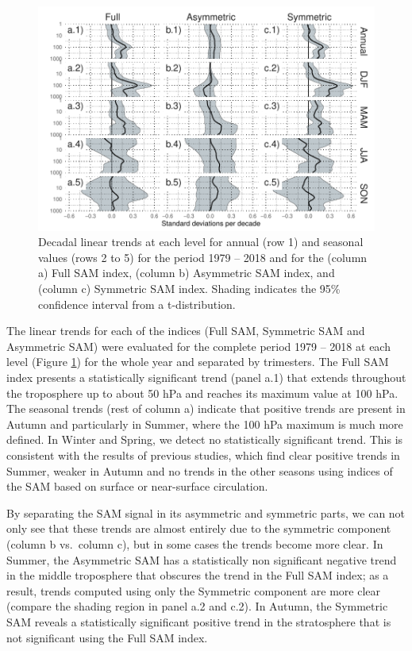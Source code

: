 \documentclass[]{ametsocV5}
\begin{document}
\begin{figure}
\includegraphics{trends-1} \caption[Decadal linear trends at each level for annual (row 1) and seasonal values (rows 2 to 5) for the period 1979 -- 2018 and for the (column a) Full SAM index, (column b) Asymmetric SAM index, and (column c) Symmetric SAM index]{Decadal linear trends at each level for annual (row 1) and seasonal values (rows 2 to 5) for the period 1979 -- 2018 and for the (column a) Full SAM index, (column b) Asymmetric SAM index, and (column c) Symmetric SAM index. Shading indicates the 95\% confidence interval from a t-distribution.}\label{fig:trends}
\end{figure}

The linear trends for each of the indices (Full SAM, Symmetric SAM and Asymmetric SAM) were evaluated for the complete period 1979 -- 2018 at each level (Figure \ref{fig:trends}) for the whole year and separated by trimesters. The Full SAM index presents a statistically significant trend (panel a.1) that extends throughout the troposphere up to about 50 hPa and reaches its maximum value at 100 hPa. The seasonal trends (rest of column a) indicate that positive trends are present in Autumn and particularly in Summer, where the 100 hPa maximum is much more defined. In Winter and Spring, we detect no statistically significant trend. This is consistent with the results of previous studies, which find clear positive trends in Summer, weaker in Autumn and no trends in the other seasons \citep[e.g.][ and references therein]{fogt2020} using indices of the SAM based on surface or near-surface circulation.

By separating the SAM signal in its asymmetric and symmetric parts, we can not only see that these trends are almost entirely due to the symmetric component (column b vs.~column c), but in some cases the trends become more clear. In Summer, the Asymmetric SAM has a statistically non significant negative trend in the middle troposphere that obscures the trend in the Full SAM index; as a result, trends computed using only the Symmetric component are more clear (compare the shading region in panel a.2 and c.2). In Autumn, the Symmetric SAM reveals a statistically significant positive trend in the stratosphere that is not significant using the Full SAM index.
\end{document}
